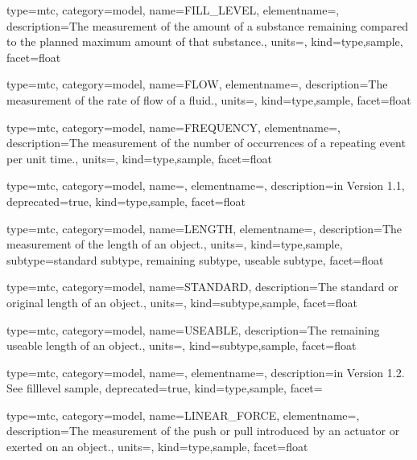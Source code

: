 {
  type=mtc,
  category=model,
  name={FILL\_LEVEL},
  elementname=,
  description={The measurement of the amount of a substance remaining compared to the planned maximum amount of that substance.},
  units=,
  kind={type,sample},
  facet={\gls{float}}
}


{
  type=mtc,
  category=model,
  name={FLOW},
  elementname=,
  description={The measurement of the rate of flow of a fluid.},
  units=,
  kind={type,sample},
  facet={\gls{float}}
}


{
  type=mtc,
  category=model,
  name={FREQUENCY},
  elementname=,
  description={The measurement of the number of occurrences of a repeating event per unit time.},
  units=,
  kind={type,sample},
  facet={\gls{float}}
}


{
  type=mtc,
  category=model,
  name=,
  elementname=,
  description={\DEPRECATED in Version 1.1},
  deprecated={true},
  kind={type,sample},
  facet={\gls{float}}
}


{
  type=mtc,
  category=model,
  name={LENGTH},
  elementname=,
  description={The measurement of the length of an object.},
  units=,
  kind={type,sample},
  subtype={\gls{standard subtype}, \gls{remaining subtype}, \gls{useable subtype}},
  facet={\gls{float}}
}


{
  type=mtc,
  category=model,
  name={STANDARD},
  description={The standard or original length of an object.},
  units=,
  kind={subtype,sample},
  facet={\gls{float}}
}


{
  type=mtc,
  category=model,
  name={USEABLE},
  description={The remaining useable length of an object.},
  units=,
  kind={subtype,sample},
  facet={\gls{float}}
}


{
  type=mtc,
  category=model,
  name=,
  elementname=,
  description={\DEPRECATED in Version 1.2.  See \gls{filllevel sample}},
  deprecated={true},
  kind={type,sample},
  facet={}
}


{
  type=mtc,
  category=model,
  name={LINEAR\_FORCE},
  elementname=,
  description={The measurement of the push or pull introduced by an actuator or exerted on an object.},
  units=,
  kind={type,sample},
  facet={\gls{float}}
}


